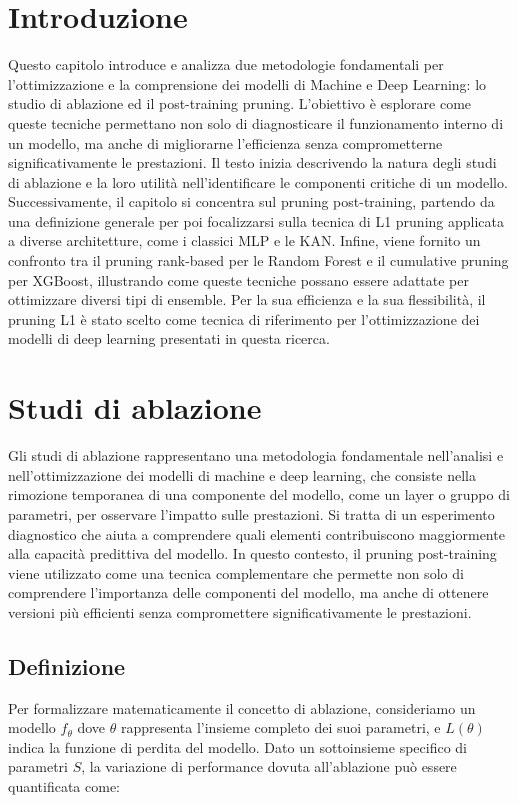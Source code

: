 \documentclass[a4paper,12pt]{report}
\begin{document}
	\section{Introduzione}
	Questo capitolo introduce e analizza due metodologie fondamentali per l'ottimizzazione e la comprensione dei modelli di Machine e Deep Learning: lo studio di ablazione ed il post-training pruning. L'obiettivo è esplorare come queste tecniche permettano non solo di diagnosticare il funzionamento interno di un modello, ma anche di migliorarne l'efficienza senza comprometterne significativamente le prestazioni. Il testo inizia descrivendo la natura degli studi di ablazione e la loro utilità nell'identificare le componenti critiche di un modello. Successivamente, il capitolo si concentra sul pruning post-training, partendo da una definizione generale per poi focalizzarsi sulla tecnica di L1 pruning applicata a diverse architetture, come i classici MLP e le KAN. Infine, viene fornito un confronto tra il pruning rank-based per le Random Forest e il cumulative pruning per XGBoost, illustrando come queste tecniche possano essere adattate per ottimizzare diversi tipi di ensemble. Per la sua efficienza e la sua flessibilità, il pruning L1 è stato scelto come tecnica di riferimento per l'ottimizzazione dei modelli di deep learning presentati in questa ricerca. \cite{meyes2019ablation, vadera2021dnnpruning, tsoumakas1970rfpruning}
	
	\section{Studi di ablazione}
	Gli studi di ablazione rappresentano una metodologia fondamentale nell'analisi e nell'ottimizzazione dei modelli di machine e deep learning, che consiste nella rimozione temporanea di una componente del modello, come un layer o gruppo di parametri, per osservare l'impatto sulle prestazioni. Si tratta di un esperimento diagnostico che aiuta a comprendere quali elementi contribuiscono maggiormente alla capacità predittiva del modello. In questo contesto, il pruning post-training viene utilizzato come una tecnica complementare che permette non solo di comprendere l'importanza delle componenti del modello, ma anche di ottenere versioni più efficienti senza compromettere significativamente le prestazioni.
	
	\subsection{Definizione}
	Per formalizzare matematicamente il concetto di ablazione, consideriamo un modello $f_\theta$ dove $\theta$ rappresenta l'insieme completo dei suoi parametri, e $L(\theta)$ indica la funzione di perdita del modello. Dato un sottoinsieme specifico di parametri $S$, la variazione di performance dovuta all'ablazione può essere quantificata come:
	
\end{document}
